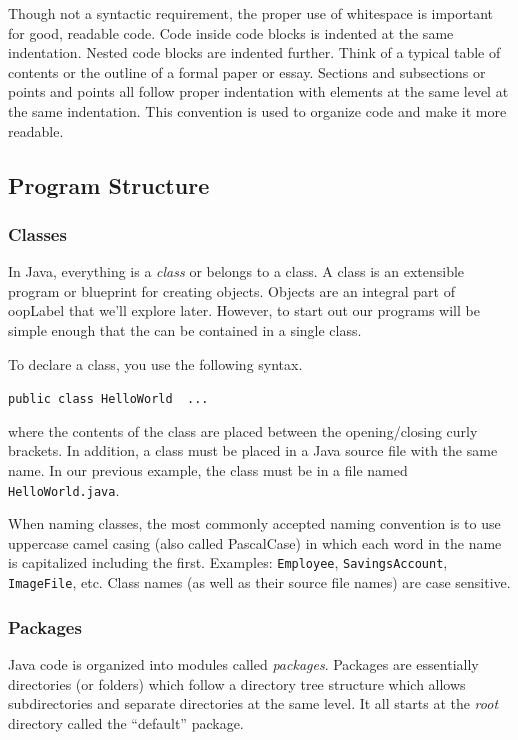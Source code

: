 Though not a syntactic requirement, the proper use of whitespace is important for
good, readable code.  Code inside code blocks is indented at the same indentation.
Nested code blocks are indented further.  Think of a typical table of contents or
the outline of a formal paper or essay.  Sections and subsections or points and 
points all follow proper indentation with elements at the same level at the same
indentation.  This convention is used to organize code and make it more readable.

\subsection{Program Structure}

\subsubsection{Classes}

In Java, everything is a \emph{class} or belongs to a class.  A class is an 
extensible program or blueprint for creating objects.  Objects are an integral
part of \gls{oopLabel} that we'll explore later.  However, to start out our
programs will be simple enough that the can be contained in a single class.

To declare a class, you use the following syntax.

\texttt{public class HelloWorld { ... }}

where the contents of the class are placed between the opening/closing curly
brackets.  In addition, a class must be placed in a Java source file with the same
name.  In our previous example, the class must be in a file named 
\texttt{HelloWorld.java}.  

When naming classes, the most commonly accepted naming convention 
is to use uppercase camel casing (also called PascalCase) in which each
word in the name is capitalized including the first.  Examples:
\texttt{Employee}, \texttt{SavingsAccount}, 
\texttt{ImageFile}, etc.  Class names (as well as their source file
names) are case sensitive.

\subsubsection{Packages}

Java code is organized into modules called \emph{packages}.  Packages
are essentially directories (or folders) which follow a directory tree 
structure which allows subdirectories and separate directories at the same
level.  It all starts at the \emph{root} directory called the ``default'' package.

